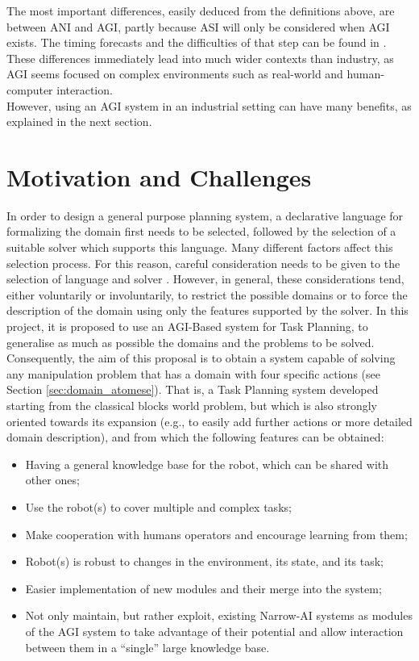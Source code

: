 The most important differences, easily deduced from the definitions above, are between ANI and AGI, partly because ASI will only be considered when AGI exists. 
The timing forecasts and the difficulties of that step can be found in \cite{995_experts_opinions}. \\
These differences immediately lead into much wider contexts than industry, as AGI seems focused on complex environments such as real-world and human-computer interaction. \\
However, using an AGI system in an industrial setting can have many benefits, as explained in the next section.


\section{Motivation and Challenges}\label{sec:motivation} %

In order to design a general purpose planning system, a declarative language for formalizing the domain first needs to be selected, followed by the selection of a suitable solver which supports this language. Many different factors affect this selection process.
For this reason, careful consideration needs to be given to the selection of language and solver \cite{DBLP:journals/corr/abs-1804-08229}.
However, in general, these considerations tend, either voluntarily or involuntarily, to restrict the possible domains or to force the description of the domain using only the features supported by the solver.
In this project, it is proposed to use an AGI-Based system for Task Planning, to generalise as much as possible the domains and the problems to be solved.
Consequently, the aim of this proposal is to obtain a system capable of solving any manipulation problem that has a domain with four specific actions (see Section \ref{sec:domain_atomese}).  
That is, a Task Planning system developed starting from the classical blocks world problem, but which is also strongly oriented towards its expansion (e.g., to easily add further actions or more detailed domain description), and from which the following features can be obtained:

\begin{itemize}
	\item Having a general knowledge base for the robot, which can be shared with other ones;
	\item Use the robot(s) to cover multiple and complex tasks;
	\item Make cooperation with humans operators and encourage learning from them;
	\item Robot(s) is robust to changes in the environment, its state, and its task;
	\item Easier implementation of new modules and their merge into the system;
	\item Not only maintain, but rather exploit, existing Narrow-AI systems as modules of the AGI system to take advantage of their potential and allow interaction between them in a \enquote{single} large knowledge base.
\end{itemize}

